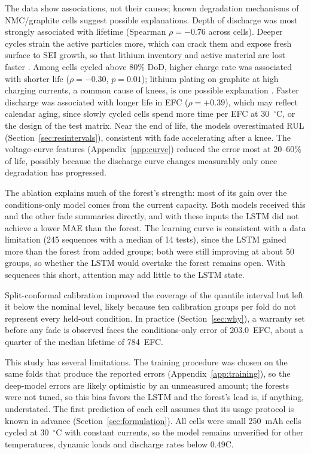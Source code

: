 \documentclass[conference]{IEEEtran}
\begin{document}
The data show associations, not their causes; known degradation mechanisms of NMC/graphite cells suggest possible explanations. Depth of discharge was most strongly associated with lifetime (Spearman $\rho = -0.76$ across cells). Deeper cycles strain the active particles more, which can crack them and expose fresh surface to SEI growth, so that lithium inventory and active material are lost faster \cite{woody2020}. Among cells cycled above 80\% DoD, higher charge rate was associated with shorter life ($\rho = -0.30$, $p = 0.01$); lithium plating on graphite at high charging currents, a common cause of knees, is one possible explanation \cite{attia2022}. Faster discharge was associated with longer life in EFC ($\rho = +0.39$), which may reflect calendar aging, since slowly cycled cells spend more time per EFC at 30~$^\circ$C, or the design of the test matrix. Near the end of life, the models overestimated RUL (Section~\ref{sec:resintervals}), consistent with fade accelerating after a knee. The voltage-curve features (Appendix~\ref{app:curve}) reduced the error most at 20--60\% of life, possibly because the discharge curve changes measurably only once degradation has progressed.

The ablation explains much of the forest's strength: most of its gain over the conditions-only model comes from the current capacity. Both models received this and the other fade summaries directly, and with these inputs the LSTM did not achieve a lower MAE than the forest. The learning curve is consistent with a data limitation (245 sequences with a median of 14 tests), since the LSTM gained more than the forest from added groups; both were still improving at about 50 groups, so whether the LSTM would overtake the forest remains open. With sequences this short, attention may add little to the LSTM state.

Split-conformal calibration improved the coverage of the quantile interval but left it below the nominal level, likely because ten calibration groups per fold do not represent every held-out condition. In practice (Section~\ref{sec:why}), a warranty set before any fade is observed faces the conditions-only error of 203.0~EFC, about a quarter of the median lifetime of 784~EFC.

This study has several limitations. The training procedure was chosen on the same folds that produce the reported errors (Appendix~\ref{app:training}), so the deep-model errors are likely optimistic by an unmeasured amount; the forests were not tuned, so this bias favors the LSTM and the forest's lead is, if anything, understated. The first prediction of each cell assumes that its usage protocol is known in advance (Section~\ref{sec:formulation}). All cells were small 250~mAh cells cycled at 30~$^\circ$C with constant currents, so the model remains unverified for other temperatures, dynamic loads and discharge rates below 0.49C.
\end{document}
